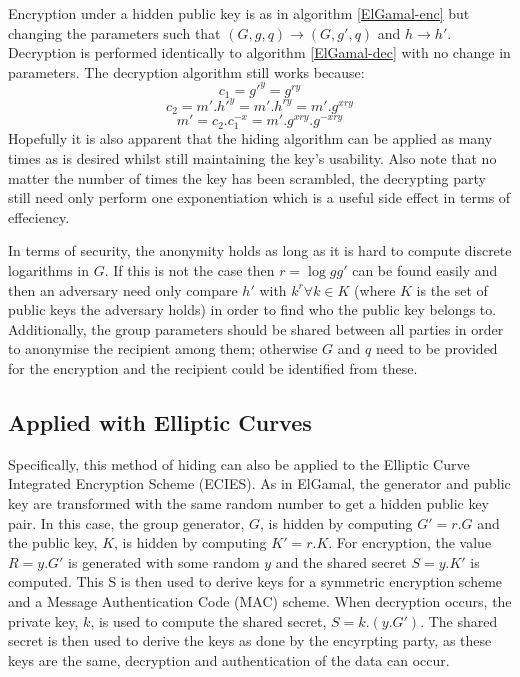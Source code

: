 \documentclass[ %
                    author={Luke Murray},
                supervisor={Dr. Simon Hollis},
                     title={Shadow Peer-to-Peer Networks},
                  subtitle={},
                    degree={MEng},
                      year={2013} ]{thesis}
\begin{document}
Encryption under a hidden public key is as in algorithm \ref{ElGamal-enc} but changing the parameters such that $(G, g, q) \rightarrow (G, g\prime, q)$ and $h \rightarrow h\prime$. Decryption is performed identically to algorithm \ref{ElGamal-dec} with no change in parameters. The decryption algorithm still works because:
\[c_1 = g\prime^{y} = g^{ry}\]
\[c_2 = m\prime.h\prime^{y} = m\prime.h^{ry} = m\prime.g^{xry}\]
\[m\prime = c_2.c_1^{-x} = m\prime.g^{xry}.g^{-xry}\]
Hopefully it is also apparent that the hiding algorithm can be applied as many times as is desired whilst still maintaining the key's usability. Also note that no matter the number of times the key has been scrambled, the decrypting party still need only perform one exponentiation which is a useful side effect in terms of effeciency. 

In terms of security, the anonymity holds as long as it is hard to compute discrete logarithms in $G$. If this is not the case then $r = \log{g}g\prime$ can be found easily and then an adversary need only compare $h\prime$ with $k^{r} \forall k \in K$ (where $K$ is the set of public keys the adversary holds) in order to find who the public key belongs to. Additionally, the group parameters should be shared between all parties in order to anonymise the recipient among them; otherwise $G$ and $q$ need to be provided for the encryption and the recipient could be identified from these.

\subsection{Applied with Elliptic Curves}

Specifically, this method of hiding can also be applied to the Elliptic Curve Integrated Encryption Scheme (ECIES)\cite{ECIES}. As in ElGamal, the generator and public key are transformed with the same random number to get a hidden public key pair. In this case, the group generator, $G$, is hidden by computing $G\prime = r.G$ and the public key, $K$, is hidden by computing $K\prime = r.K$. For encryption, the value $R = y.G\prime$ is generated with some random $y$ and the shared secret $S = y.K\prime$ is computed. This S is then used to derive keys for a symmetric encryption scheme and a Message Authentication Code (MAC) scheme. When decryption occurs, the private key, $k$, is used to compute the shared secret, $S = k.(y.G\prime)$. The shared secret is then used to derive the keys as done by the encyrpting party, as these keys are the same, decryption and authentication of the data can occur.
\end{document}
